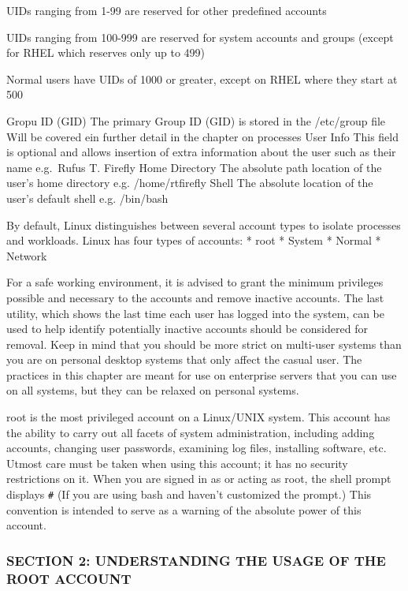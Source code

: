 UIDs ranging from 1-99 are reserved for other predefined accounts

UIDs ranging from 100-999 are reserved for system accounts and groups
(except for RHEL which reserves only up to 499)

Normal users have UIDs of 1000 or greater, except on RHEL where they
start at 500

Gropu ID (GID) \textbar{} The primary Group ID (GID) is stored in the
/etc/group file \textbar{} Will be covered ein further detail in the
chapter on processes User Info \textbar{} This field is optional and
allows insertion of extra information about the user such as their name
\textbar{} e.g.~Rufus T. Firefly Home Directory \textbar{} The absolute
path location of the user's home directory \textbar{} e.g.
/home/rtfirefly Shell \textbar{} The absolute location of the user's
default shell \textbar{} e.g. /bin/bash

By default, Linux distinguishes between several account types to isolate
processes and workloads. Linux has four types of accounts: * root *
System * Normal * Network

For a safe working environment, it is advised to grant the minimum
privileges possible and necessary to the accounts and remove inactive
accounts. The last utility, which shows the last time each user has
logged into the system, can be used to help identify potentially
inactive accounts should be considered for removal. Keep in mind that
you should be more strict on multi-user systems than you are on personal
desktop systems that only affect the casual user. The practices in this
chapter are meant for use on enterprise servers that you can use on all
systems, but they can be relaxed on personal systems.

root is the most privileged account on a Linux/UNIX system. This account
has the ability to carry out all facets of system administration,
including adding accounts, changing user passwords, examining log files,
installing software, etc. Utmost care must be taken when using this
account; it has no security restrictions on it. When you are signed in
as or acting as root, the shell prompt displays \texttt{\#} (If you are
using bash and haven't customized the prompt.) This convention is
intended to serve as a warning of the absolute power of this account.

\subsubsection{SECTION 2: UNDERSTANDING THE USAGE OF THE ROOT
ACCOUNT}\label{section-2-understanding-the-usage-of-the-root-account}

